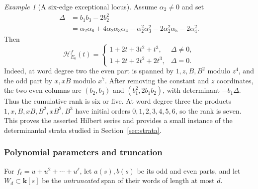 \documentclass[reqno]{article}
\theoremstyle{plain} %
\theoremstyle{definition}
\theoremstyle{remark}
\newtheorem{example}[theorem]{\sc Example}
\newcommand{\K} {\mathbf{k}}
\newcommand{\hs}{\mathscr{H}}
\numberwithin{equation}{section}
\begin{document}
\begin{example}[A six-edge exceptional locus]
\label{ex:parallel-six}
Assume $\alpha_2\ne0$ and set
\begin{equation}\label{eq:parallel-six-determinant}
\begin{split}
 \Delta&=b_1b_3-2b_2^2\\
 &=\alpha_2\alpha_6+4\alpha_2\alpha_3\alpha_4
   -\alpha_2^2\alpha_3^2-2\alpha_2^2\alpha_5-2\alpha_4^2.
\end{split}
\end{equation}
Then
\[
 \hs_{E_6}^f(t)=
 \begin{cases}
  1+2t+3t^2+t^3,&\Delta\ne0,\\
  1+2t+2t^2+2t^3,&\Delta=0.
 \end{cases}
\]
Indeed, at word degree two the even part is spanned by $1,z,B,B^2$
modulo $z^4$, and the odd part by $x,xB$ modulo $x^7$.
After removing the constant and $z$ coordinates, the two even columns
are $(b_2,b_3)$ and $(b_1^2,2b_1b_2)$, with determinant $-b_1\Delta$.
Thus the cumulative rank is six or five. At word degree three the
products $1,x,B,xB,B^2,xB^2,B^3$ have initial orders $0,1,2,3,4,5,6$,
so the rank is seven. This proves the asserted Hilbert series and
provides a small instance of the determinantal strata studied in
Section~\ref{sec:strata}.
\end{example}

\subsubsection{Polynomial parameters and truncation}

For $f_\ell=u+u^2+\cdots+u^\ell$, let $a(s),b(s)$ be its odd and
even parts, and let $W_d\subset\K[s]$ be the \emph{untruncated}
span of their words of length at most $d$.
\end{document}
